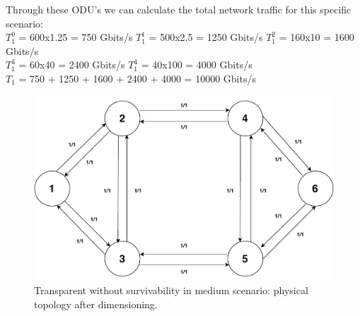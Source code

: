 \vspace{17pt}
Through these ODU's we can calculate the total network traffic for this specific scenario:\\

$T_1^0$ = 600x1.25 = 750 Gbits/s \qquad
$T_1^1$ = 500x2.5 = 1250 Gbits/s \qquad
$T_1^2$ = 160x10 = 1600 Gbits/s \\

$T_1^3$ = 60x40 = 2400 Gbits/s \quad
$T_1^4$ = 40x100 = 4000 Gbits/s \\

$T_{1}$ = 750 + 1250 + 1600 + 2400 + 4000 = 10000 Gbits/s \qquad \\

\begin{figure}[H]
	\centering
	\includegraphics[width=15cm]{sdf/heuristic/transparent/figures/physicalTopology_low_traffic}
	\caption{Transparent without survivability in medium scenario: physical topology after dimensioning.}
	\label{physical_topology_medium_traffic}
\end{figure}


